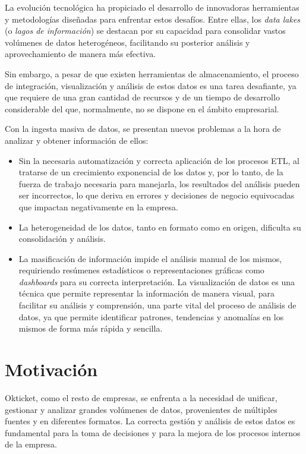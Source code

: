 La evolución tecnológica ha propiciado el desarrollo de innovadoras herramientas
y metodologías diseñadas para enfrentar estos desafíos. Entre ellas, los
\textit{data lakes} (o \emph{lagos de información}) se destacan por su capacidad
para consolidar vastos volúmenes de datos heterogéneos, facilitando su posterior
análisis y aprovechamiento de manera más efectiva.

Sin embargo, a pesar de que existen herramientas de almacenamiento, el proceso
de integración, visualización y análisis de estos datos es una tarea desafiante,
ya que requiere de una gran cantidad de recursos y de un tiempo de desarrollo
considerable del que, normalmente, no se dispone en el ámbito empresarial.

Con la ingesta masiva de datos, se presentan nuevos problemas a la hora de
analizar y obtener información de ellos:



\begin{itemize}
	\item Sin la necesaria automatización y correcta aplicación de los procesos
		ETL, al tratarse de un crecimiento exponencial de los datos y, por lo
		tanto, de la fuerza de trabajo necesaria para manejarla, los resultados
		del análisis pueden ser incorrectos, lo que deriva en errores y
		decisiones de negocio equivocadas que impactan negativamente en la
		empresa. 
	\item La heterogeneidad de los datos, tanto en formato como en origen,
		dificulta su consolidación y análisis.
	\item La masificación de información impide el análisis manual de los
		mismos, requiriendo resúmenes estadísticos o representaciones gráficas
		como \textit{dashboards} para su correcta interpretación.
		La visualización de datos es una técnica que permite representar la
		información de manera visual, para facilitar su análisis y comprensión,
		una parte vital del proceso de análisis de datos, ya que permite
		identificar patrones, tendencias y anomalías en los mismos de forma más
		rápida y sencilla.
\end{itemize}

\newpage{}
\section{Motivación}\label{sec:motivacion}
Okticket, como el resto de empresas, se enfrenta a la necesidad de unificar, gestionar y
analizar grandes volúmenes de datos, provenientes de múltiples fuentes y en
diferentes formatos. La correcta gestión y análisis de estos datos es
fundamental para la toma de decisiones y para la mejora de los procesos internos
de la empresa.

